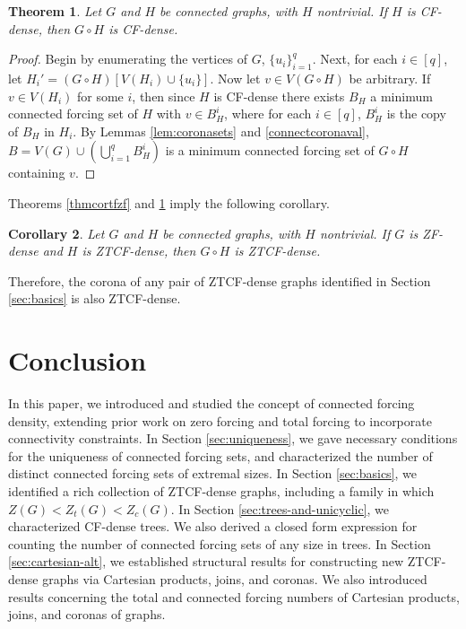 \documentclass[11pt]{article}
\newtheorem{thm}{Theorem}
\newtheorem{cor}[thm]{Corollary}
\theoremstyle{definition}
\newcommand{\1}{\vspace{0.1cm}}
\newcommand{\2}{\vspace{0.2cm}}
\newcommand{\3}{\vspace{0.3cm}}
\begin{document}
\begin{thm}
\label{thmcorcon}
Let $G$ and $H$ be connected graphs, with $H$ nontrivial.  If $H$ is CF-dense, then $G \circ H$ is CF-dense.
\end{thm}

\begin{proof}
Begin by enumerating the vertices of $G$, $\{u_i\}_{i=1}^q$.  Next, for each $i \in [q]$, let $H_i'=(G \circ H)[V(H_i) \cup \{u_i\}]$.  Now let $v \in V(G \circ H)$ be arbitrary.  If $v \in V(H_i)$ for some $i$, then since $H$ is CF-dense there exists $B_H$ a minimum connected forcing set of $H$ with $v \in B_H^i$, where for each $i \in [q]$, $B_H^i$ is the copy of $B_H$ in $H_i$.  By Lemmas \ref{lem:coronasets} and \ref{connectcoronaval}, $B=V(G) \cup (\bigcup_{i=1}^{q}B_H^i)$ is a minimum connected forcing set of $G \circ H$ containing $v$.
\end{proof}

Theorems \ref{thmcortfzf} and \ref{thmcorcon} imply the following corollary.

\begin{cor}
Let $G$ and $H$ be connected graphs, with $H$ nontrivial.  If $G$ is ZF-dense and $H$ is ZTCF-dense, then $G \circ H$ is ZTCF-dense. 
\end{cor}

Therefore, the corona of any pair of ZTCF-dense graphs identified in Section \ref{sec:basics} is also ZTCF-dense. 



\section{Conclusion}
\label{sec:conclusion}
In this paper, we introduced and studied the concept of connected forcing density, extending prior work on zero forcing and total forcing to incorporate connectivity constraints. In Section \ref{sec:uniqueness}, we gave necessary conditions for the uniqueness of connected forcing sets, and characterized the number of distinct connected forcing sets of extremal sizes. In Section \ref{sec:basics}, we identified a rich collection of ZTCF-dense graphs, including a family in which $Z(G) < Z_t(G) < Z_c(G)$. In Section \ref{sec:trees-and-unicyclic}, we characterized CF-dense trees. We also derived a closed form expression for counting the number of connected forcing sets of any size in trees. In Section \ref{sec:cartesian-alt}, we established structural results for constructing new ZTCF-dense graphs via Cartesian products, joins, and coronas.  We also introduced results concerning the total and connected forcing numbers of Cartesian products, joins, and coronas of graphs.
\end{document}
